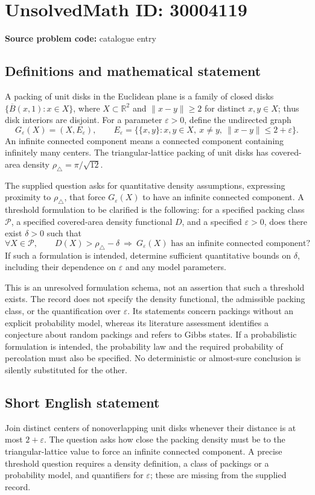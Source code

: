 \documentclass[11pt]{article}
\newcommand{\R}{\mathbb{R}}
\begin{document}
\section*{UnsolvedMath ID: 30004119}
\textbf{Source problem code:} catalogue entry
\subsection{Definitions and mathematical statement}
A packing of unit disks in the Euclidean plane is a family of closed disks \(\{\overline B(x,1):x\in X\}\), where \(X\subset\R^2\) and \(\lVert x-y\rVert\geq 2\) for distinct \(x,y\in X\); thus disk interiors are disjoint. For a parameter \(\varepsilon>0\), define the undirected graph
\[
G_\varepsilon(X)=(X,E_\varepsilon),\qquad
E_\varepsilon=\bigl\{\{x,y\}:x,y\in X,\ x\ne y,\ \lVert x-y\rVert\leq 2+\varepsilon\bigr\}.
\]
An infinite connected component means a connected component containing infinitely many centers. The triangular-lattice packing of unit disks has covered-area density \(\rho_\triangle=\pi/\sqrt{12}\).

The supplied question asks for quantitative density assumptions, expressing proximity to \(\rho_\triangle\), that force \(G_\varepsilon(X)\) to have an infinite connected component. A threshold formulation to be clarified is the following: for a specified packing class \(\mathcal P\), a specified covered-area density functional \(D\), and a specified \(\varepsilon>0\), does there exist \(\delta>0\) such that
\[
\forall X\in\mathcal P,\qquad
D(X)>\rho_\triangle-\delta
\ \Longrightarrow\
G_\varepsilon(X)\text{ has an infinite connected component}?
\]
If such a formulation is intended, determine sufficient quantitative bounds on \(\delta\), including their dependence on \(\varepsilon\) and any model parameters.

This is an unresolved formulation schema, not an assertion that such a threshold exists. The record does not specify the density functional, the admissible packing class, or the quantification over \(\varepsilon\). Its statements concern packings without an explicit probability model, whereas its literature assessment identifies a conjecture about random packings and refers to Gibbs states. If a probabilistic formulation is intended, the probability law and the required probability of percolation must also be specified. No deterministic or almost-sure conclusion is silently substituted for the other.
\subsection{Short English statement}
Join distinct centers of nonoverlapping unit disks whenever their distance is at most \(2+\varepsilon\). The question asks how close the packing density must be to the triangular-lattice value to force an infinite connected component. A precise threshold question requires a density definition, a class of packings or a probability model, and quantifiers for \(\varepsilon\); these are missing from the supplied record.
\end{document}
